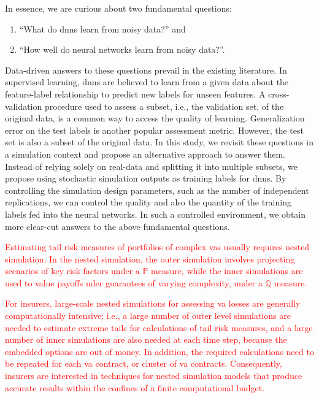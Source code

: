 In essence, we are curious about two fundamental questions:
\begin{enumerate}
    \item ``What do \gls{dnn}s learn from noisy data?'' and 
    \item ``How well do neural networks learn from noisy data?''.
\end{enumerate}
Data-driven answers to these questions prevail in the existing literature.
In supervised learning, \gls{dnn}s are believed to learn from a given data about the feature-label relationship to predict new labels for unseen features.
A cross-validation procedure used to assess a subset, i.e., the validation set, of the original data, is a common way to access the quality of learning.
Generalization error on the test labels is another popular assessment metric.
However, the test set is also a subset of the original data.
In this study, we revisit these questions in a simulation context and propose an alternative approach to answer them.
Instead of relying solely on real-data and splitting it into multiple subsets, we propose using stochastic simulation outputs as training labels for \gls{dnn}s.
By controlling the simulation design parameters, such as the number of independent replications, we can control the quality and also the quantity of the training labels fed into the neural networks.
In such a controlled environment, we obtain more clear-cut answers to the above fundamental questions.

\textcolor{red}{Estimating tail risk measures of portfolios of complex \gls{va}s usually requires nested simulation.
In the nested simulation, the outer simulation involves projecting scenarios of key risk factors under a $\mathbb{P}$ measure, while the inner simulations are used to value payoffs uder guarantees of varying complexity, under a $\mathbb{Q}$ measure.}

\textcolor{red}{For insurers, large-scale nested simulations for assessing \gls{va} losses are generally computationally intensive; i.e., a large number of outer level simulations are needed to estimate extreme tails for calculations of tail risk measures, and a large number of inner simulations are also needed at each time step, because the embedded options are out of money. 
In addition, the required calculations need to be repeated for each \gls{va} contract, or cluster of \gls{va} contracts.
Consequently, insurers are interested in techniques for nested simulation models that produce accurate results within the confines of a finite computational budget.}

